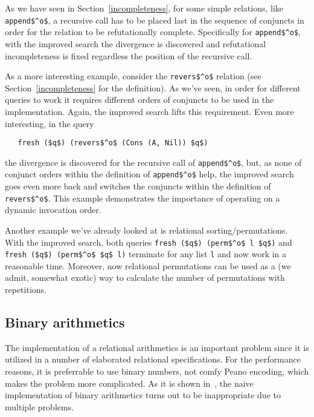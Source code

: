 As we have seen in Section~\ref{incompleteness}, for some simple relations, like \lstinline|append$^o$|,
a recursive call has to be placed last in the sequence of conjuncts in order for the 
relation to be refutationally complete. Specifically for \lstinline|append$^o$|, with the improved search 
the divergence is discovered and refutational incompleteness is fixed regardless the position of 
the recursive call.

As a more interesting example, consider the \lstinline|revers$^o$| relation (see Section~\ref{incompleteness}
for the definition). As we've seen, in order for different queries to work it requires different orders of conjuncts 
to be used in the implementation. Again, the improved search lifts this requirement.
Even more interesting, in the query 

\begin{lstlisting}
   fresh ($q$) (revers$^o$ (Cons (A, Nil)) $q$)
\end{lstlisting}

\noindent the divergence is discovered for the recursive call of \lstinline|append$^o$|, but,
as none of conjunct orders within the definition of \lstinline|append$^o$| help, the
improved search goes even more back and switches the conjuncts within the definition of
\lstinline|revers$^o$|. This example demonstrates the importance of operating on 
a dynamic invocation order.

Another example we've already looked at is relational sorting/permutations. 
With the improved search, both queries \lstinline|fresh ($q$) (perm$^o$ l $q$)| and 
\lstinline|fresh ($q$) (perm$^o$ $q$ l)| terminate for any list \lstinline|l| and now work
in a reasonable time. Moreover, now relational permutations can be used as a (we admit,
somewhat exotic) way to calculate the number of permutations with repetitions.

\subsection{Binary arithmetics}

The implementation of a relational arithmetics is an important problem since it is utilized
in a number of elaborated relational specifications. For the performance reasons, it is 
preferrable to use binary numbers, not comfy Peano encoding, which makes the problem 
more complicated. As it is shown in~\cite{WillThesis}, the naive implementation of 
binary arithmetics turns out to be inappropriate due to multiple problems. 

